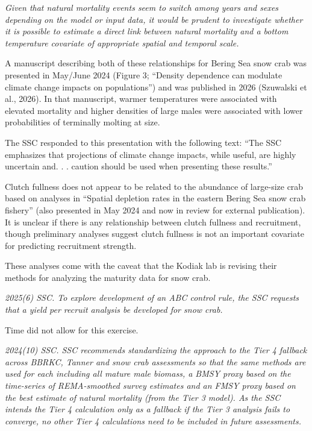 \documentclass[
]{article}
\begin{document}
\emph{Given that natural mortality events seem to switch among years and sexes depending on the model or input data, it would be prudent to investigate whether it is possible to estimate a direct link between natural mortality and a bottom temperature covariate of appropriate spatial and temporal scale.}

A manuscript describing both of these relationships for Bering Sea snow crab was presented in May/June 2024 (Figure 3; ``Density dependence can modulate climate change impacts on populations'') and was published in 2026 (Szuwalski et al., 2026). In that manuscript, warmer temperatures were associated with elevated mortality and higher densities of large males were associated with lower probabilities of terminally molting at
size.

The SSC responded to this presentation with the following text: ``The SSC emphasizes that projections of climate change impacts, while useful, are highly uncertain and. . . caution should be used when presenting
these results.''

Clutch fullness does not appear to be related to the abundance of large-size crab based on analyses in ``Spatial depletion rates in the eastern Bering Sea snow crab fishery'' (also presented in May 2024 and now in review for external publication). It is unclear if there is any relationship between clutch fullness and recruitment, though preliminary analyses suggest clutch fullness is not an important covariate for predicting recruitment strength.

These analyses come with the caveat that the Kodiak lab is revising their methods for analyzing the maturity data for snow crab.

\emph{2025(6) SSC. To explore development of an ABC control rule, the SSC requests that a yield per recruit analysis be developed for snow crab.}

Time did not allow for this exercise.

\emph{2024(10) SSC. SSC recommends standardizing the approach to the Tier 4 fallback across BBRKC, Tanner and snow crab assessments so that the same methods are used for each including all mature male biomass, a BMSY proxy based on the time-series of REMA-smoothed survey estimates and an FMSY proxy based on the best estimate of natural mortality (from the Tier 3 model). As the SSC intends the Tier 4 calculation only as a fallback if the Tier 3 analysis fails to converge, no other Tier 4 calculations need to be included in future assessments.}
\end{document}

